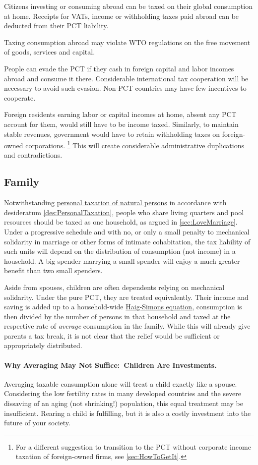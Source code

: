 Citizens investing or consuming abroad can be taxed on their global consumption at home.
Receipts for VATs, income or withholding taxes paid abroad can be deducted from their PCT liability.

Taxing consumption abroad may violate WTO regulations on the free movement of goods, services and capital.

People can evade the PCT if they cash in foreign capital and labor incomes abroad and consume it there.
Considerable international tax cooperation will be necessary to avoid such evasion.
Non-PCT countries may have few incentives to cooperate.

Foreign residents earning labor or capital incomes at home, absent any PCT account for them, would still have to be income taxed.
Similarly, to maintain stable revenues, government would have to retain withholding taxes on foreign-owned corporations.
\footnote{
	For a different suggestion to transition to the PCT without corporate income taxation of foreign-owned firms, see \autoref{sec:HowToGetIt}.
}
This will create considerable administrative duplications and contradictions.

\subsection{Family}
Notwithstanding \hyperref[des:PersonalTaxation]{personal taxation of natural persons} in accordance with desideratum \ref{des:PersonalTaxation}, people who share living quarters and pool resources should be taxed as one household, as argued in \autoref{sec:LoveMarriage}.
Under a progressive schedule and with no, or only a small penalty to mechanical solidarity in marriage or other forms of intimate cohabitation, the tax liability of such units will depend on the distribution of consumption (not income) in a household.
A big spender marrying a small spender will enjoy a much greater benefit than two small spenders.

Aside from spouses, children are often dependents relying on mechanical solidarity.
Under the pure PCT, they are treated equivalently.
Their income and saving is added up to a household-wide \hyperref[eq:HaigSimons]{Haig-Simons equation}, consumption is then divided by the number of persons in that household and taxed at the respective rate of \emph{average} consumption in the family.
While this will already give parents a tax break, it is not clear that the relief would be sufficient or appropriately distributed.

\paragraph{Why Averaging May Not Suffice:~Children Are Investments.}
Averaging taxable consumption alone will treat a child exactly like a spouse.
Considering the low fertility rates in many developed countries and the severe dissaving of an aging (not shrinking!) population, this equal treatment may be insufficient.
Rearing a child is fulfilling, but it is also a costly investment into the future of your society.

